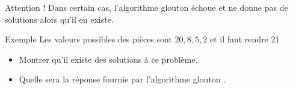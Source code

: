 \documentclass[10pt]{beamer}
\begin{document}
\begin{frame}
    \mframe{\AG}
    \begin{block}{Attention !}
        Dans certain cas, l'algorithme glouton échoue et ne donne pas de solutions alors qu'il en existe.
    \end{block}
    \begin{exampleblock}{Exemple}
        Les valeurs possibles des pièces sont $20,8,5,2$ et il faut rendre 21
        \begin{itemize}
            \item<3-> Montrer qu'il existe des solutions à ce problème.
            \item<4-> Quelle sera la réponse fournie par l'algorithme glouton .
        \end{itemize}
    \end{exampleblock}
\end{frame}
\end{document}
